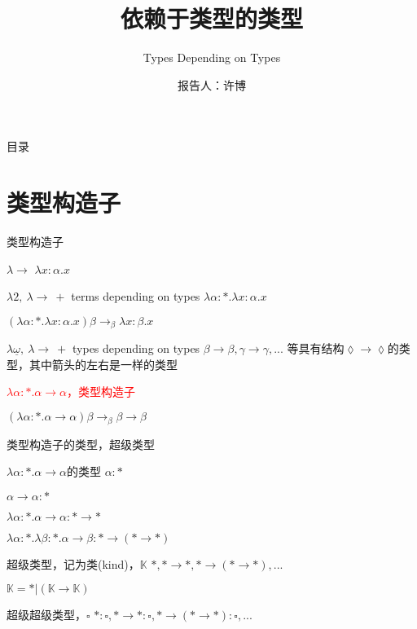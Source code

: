 \documentclass[UTF8,aspectratio=169,mathserif]{beamer}
\title{依赖于类型的类型}
\subtitle{Types Depending on Types}
\author{报告人：许博}
\date{}
\begin{document}
	
	\begin{frame}
		\titlepage
	\end{frame}

	\begin{frame}{目录}
		\tableofcontents
	\end{frame}

	\section{类型构造子}
	\begin{frame}{类型构造子}
		\begin{block}{$\lambda{\rightarrow}$}
			$\lambda x:\alpha.x$
		\end{block}
		
		\begin{block}{$\lambda{2},\ \lambda{\rightarrow}\ + $ terms depending on types}
			$\lambda\alpha:*.\lambda x:\alpha.x$
			
			$(\lambda\alpha:*.\lambda x:\alpha.x)\beta\rightarrow_\beta\lambda x:\beta.x$
		\end{block}
	
		\begin{block}{$\lambda{\underline{\omega}},\ \lambda{\rightarrow}\ + $ types depending on types}
			$\beta\rightarrow\beta,\gamma\rightarrow\gamma,...$ 等具有结构$\lozenge\rightarrow\lozenge$的类型，其中箭头的左右是一样的类型
			
			\textcolor{red}{$\lambda\alpha:*.\alpha\rightarrow\alpha$，类型构造子}
			
			$(\lambda\alpha:*.\alpha\rightarrow\alpha)\beta\rightarrow_\beta\beta\rightarrow\beta$
		\end{block}
	\end{frame}

	\begin{frame}[shrink]{类型构造子的类型，超级类型}
		\begin{block}{$\lambda\alpha:*.\alpha\rightarrow\alpha$的类型}
			$\alpha:*$
			
			$\alpha\rightarrow\alpha:*$
			
			$\lambda\alpha:*.\alpha\rightarrow\alpha:*\rightarrow*$
			
			$\lambda\alpha:*.\lambda\beta:*.\alpha\rightarrow\beta:*\rightarrow(*\rightarrow*)$
		\end{block}
		\begin{block}{超级类型，记为类(kind)，$\mathbb{K}$}
			$*, *\rightarrow*, *\rightarrow(*\rightarrow*), ...$
			
			$\mathbb{K}=*|(\mathbb{K}\rightarrow\mathbb{K})$
		\end{block}
		\begin{block}{超级超级类型，$\square$}
			$*:\square, *\rightarrow*:\square, *\rightarrow(*\rightarrow*):\square, ...$
		\end{block}
	\end{frame}
\end{document}

